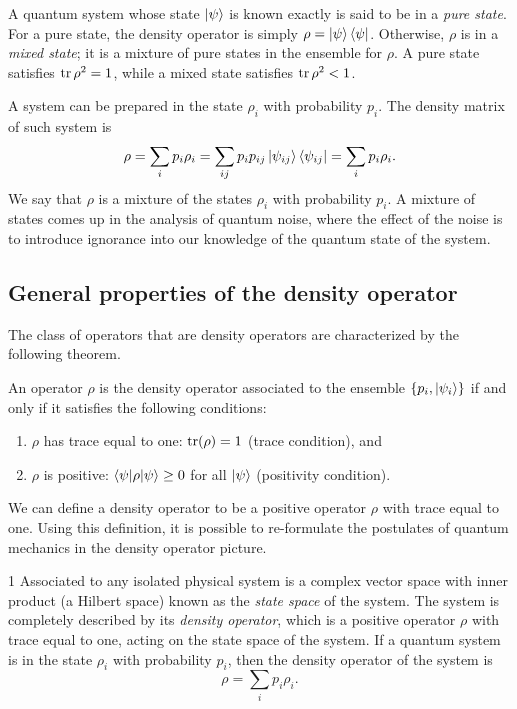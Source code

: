 A quantum system whose state $\ket{\psi}$ is known exactly is said to be in a \emph{pure state}.
For a pure state, the density operator is simply $\rho = \ket{\psi}\bra{\psi}$.
Otherwise, $\rho$ is in a \emph{mixed state};
it is a mixture of pure states in the ensemble for $\rho$.
A pure state satisfies $\operatorname{tr}{\rho^2} = 1$, while a mixed state satisfies $\operatorname{tr}{\rho^2} < 1$.

A system can be prepared in the state $\rho_i$ with probability $p_i$.
The density matrix of such system is
\[
    \rho = \sum_i p_i \rho_i = \sum_{ij} p_i p_{ij} \ket{\psi_{ij}}\bra{\psi_{ij}} = \sum_i p_i \rho_i.
\]
We say that $\rho$ is a mixture of the states $\rho_i$ with probability $p_i$.
A mixture of states comes up in the analysis of quantum noise,
where the effect of the noise is to introduce ignorance into our knowledge of the quantum state of the system.

\subsection{General properties of the density operator}
The class of operators that are density operators are characterized by the following theorem.

\begin{theorem}
    An operator $\rho$ is the density operator associated to the ensemble $\{p_i, \ket{\psi_i}\}$ if and only if it satisfies the following conditions:
    \begin{enumerate}
        \item $\rho$ has trace equal to one: $\operatorname{tr}(\rho) = 1$ (trace condition), and
        \item $\rho$ is positive: $\braket{\psi|\rho|\psi} \geq 0$ for all $\ket{\psi}$ (positivity condition).
    \end{enumerate}
\end{theorem}

We can define a density operator to be a positive operator $\rho$ with trace equal to one.
Using this definition,
it is possible to re-formulate the postulates of quantum mechanics in the density operator picture.

\begin{postulate}{1}
    Associated to any isolated physical system is a complex vector space with inner product
    (a Hilbert space) known as the \emph{state space} of the system.
    The system is completely described by its \emph{density operator},
    which is a positive operator $\rho$ with trace equal to one,
    acting on the state space of the system.
    If a quantum system is in the state $\rho_i$ with probability $p_i$,
    then the density operator of the system is
    \[
        \rho = \sum_i p_i \rho_i.
    \]
\end{postulate}

